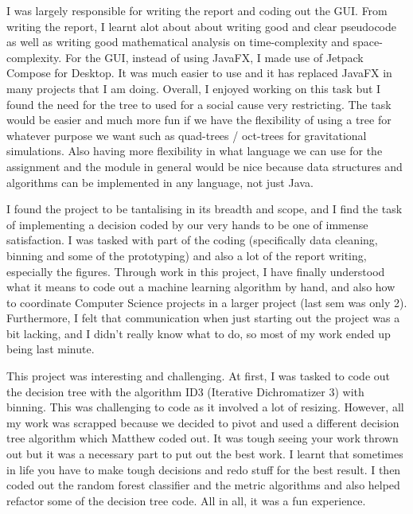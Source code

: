  I was largely responsible for writing the report and coding out the GUI. From writing the report, I learnt alot about about writing good and clear pseudocode as well as writing good mathematical analysis on time-complexity and space-complexity. For the GUI, instead of using JavaFX, I made use of Jetpack Compose for Desktop. It was much easier to use and it has replaced JavaFX in many projects that I am doing. Overall, I enjoyed working on this task but I found the need for the tree to used for a social cause very restricting. The task would be easier and much more fun if we have the flexibility of using a tree for whatever purpose we want such as quad-trees / oct-trees for gravitational simulations. Also having more flexibility in what language we can use for the assignment and the module in general would be nice because data structures and algorithms can be implemented in any language, not just Java.

I found the project to be tantalising in its breadth and scope, and I find the task of implementing a decision coded by our very hands to be one of immense satisfaction. 
I was tasked with part of the coding (specifically data cleaning, binning and some of the prototyping) and also a lot of the report writing, especially the figures.
Through work in this project, I have finally understood what it means to code out a machine learning algorithm by hand, and also how to coordinate Computer Science projects in a larger project (last sem was only 2).
Furthermore, I felt that communication when just starting out the project was a bit lacking, and I didn't really know what to do, so most of my work ended up being last minute. 

 This project was interesting and challenging. At first, I was tasked to code out the decision tree with the algorithm ID3 (Iterative Dichromatizer 3) with binning. This was challenging to code as it involved a lot of resizing. However, all my work was scrapped because we decided to pivot and used a different decision tree algorithm which Matthew coded out. It was tough seeing your work thrown out but it was a necessary part to put out the best work. I learnt that sometimes in life you have to make tough decisions and redo stuff for the best result. I then coded out the random forest classifier and the metric algorithms and also helped refactor some of the decision tree code. All in all, it was a fun experience.

